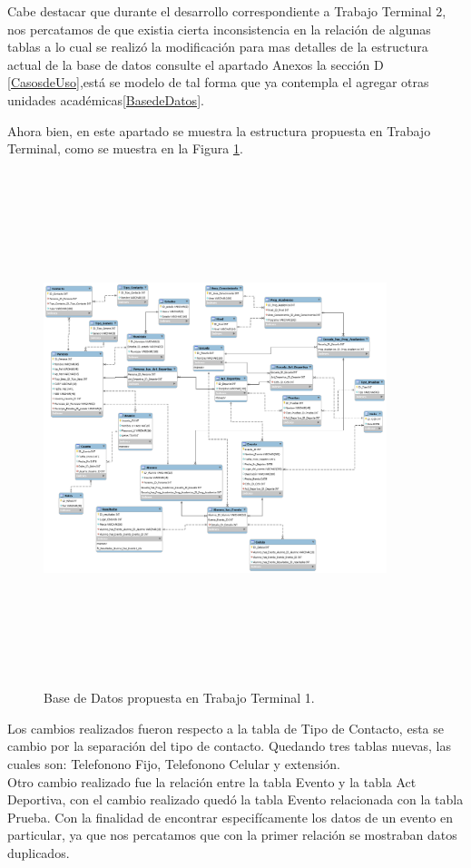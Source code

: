 	\noindent Cabe destacar que durante el desarrollo correspondiente a Trabajo Terminal 2, nos percatamos de que existia cierta inconsistencia en la relación de algunas tablas a lo cual se realizó la modificación para mas detalles de la estructura actual de la base de datos consulte el apartado Anexos la sección D \ref{CasosdeUso},está se modelo de tal forma que ya contempla el agregar otras unidades académicas\ref{BasedeDatos}. 
	
	\noindent Ahora bien, en este apartado se muestra la estructura propuesta en Trabajo Terminal, como se muestra en la Figura \ref{basededatosInicial}. 
	\pagebreak
	
	\begin{figure}[hbt!]
		\centering
		\includegraphics[angle=90, width=10cm, height=15cm]{Imagenes/BasedeDatos}
		\caption{Base de Datos propuesta en Trabajo Terminal 1.}
		\label{basededatosInicial}
	\end{figure}
	
	\noindent Los cambios realizados fueron respecto a la tabla de Tipo de Contacto, esta se cambio por la separación del tipo de contacto. Quedando tres tablas nuevas, las cuales son: Telefonono Fijo, Telefonono Celular y extensión. \\
	Otro cambio realizado fue la relación entre la tabla Evento y la tabla Act Deportiva, con el cambio realizado quedó la tabla Evento relacionada con la tabla Prueba. Con la finalidad de encontrar especifícamente los datos de un evento en particular, ya que nos percatamos que con la primer relación se mostraban datos duplicados. 
	
